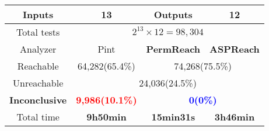 \begin{table}[ht]
\begin{small}
\begin{tabular}{|c|c|c|c|}
     Inputs    & 13 & Outputs& 12\\
     \hline
     Total tests&\multicolumn{3}{c|}{$2^{13}\times 12=98,304$}\\
     \hline
     Analyzer  &  Pint  &  \textbf{PermReach}   &\textbf{ASPReach}\\
     \hline
     Reachable & 64,282(65.4\%)  & \multicolumn{2}{c|}{74,268(75.5\%)} \\
     \hline
     Unreachable&\multicolumn{3}{c|}{24,036(24.5\%)}\\
     \hline
     \textbf{Inconclusive} &\textcolor{red}{\textbf{9,986(10.1\%)}}&\multicolumn{2}{c|}{\textcolor{blue}{\textbf{0(0\%)}}}   \\
     \hline
     Total time & \textbf{9h50min}      & \textbf{15min31s}         & \textbf{3h46min} \\
     \hline
    \end{tabular}
\end{small}

\end{table}
